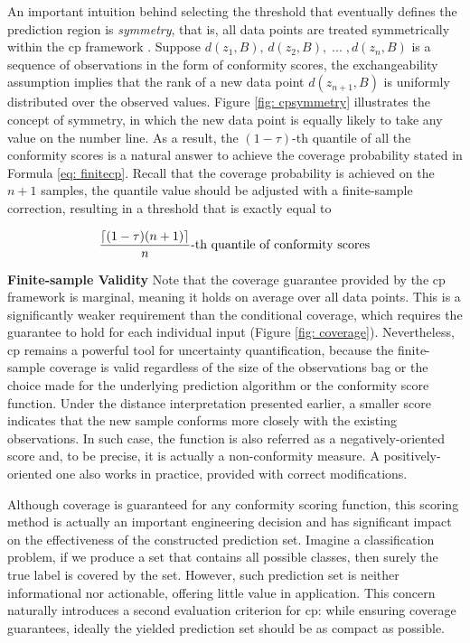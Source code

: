 \vspace{0.5em} 
An important intuition behind selecting the threshold that eventually defines the prediction region is \textit{symmetry}, that is, all data points are treated symmetrically within the \gls{cp} framework \cite{angelopoulos2021gentle}. Suppose $d(z_1, B), \, d(z_2, B), \; ... \; ,d(z_n, B)$ is a sequence of observations in the form of conformity scores, the exchangeability assumption implies that the rank of a new data point $d(z_{n+1}, B)$ is uniformly distributed over the observed values. Figure \ref{fig: cpsymmetry} illustrates the concept of symmetry, in which the new data point is equally likely to take any value on the number line. As a result, the $(1 - \tau)$-th quantile of all the conformity scores is a natural answer to achieve the coverage probability stated in Formula \ref{eq: finitecp}. Recall that the coverage probability is achieved on the $n+1$ samples, the quantile value should be adjusted with a finite-sample correction, resulting in a threshold that is exactly equal to 

\begin{equation}
\vspace{0.7em}
\frac{\lceil(1 - \tau)(n + 1)\rceil}{n}\text{-th quantile of conformity scores}
\label{eq:cpquantile}
\vspace{0.7em}
\end{equation}

\noindent
\textbf{Finite-sample Validity} Note that the coverage guarantee provided by the \gls{cp} framework is marginal, meaning it holds on average over all data points. This is a significantly weaker requirement than the conditional coverage, which requires the guarantee to hold for each individual input (Figure \ref{fig: coverage}). Nevertheless, \gls{cp} remains a powerful tool for uncertainty quantification, because the finite-sample coverage is valid regardless of the size of the observations bag or the choice made for the underlying prediction algorithm or the conformity score function. Under the distance interpretation presented earlier, a smaller score indicates that the new sample conforms more closely with the existing observations. In such case, the function is also referred as a negatively-oriented score and, to be precise, it is actually a non-conformity measure. A positively-oriented one also works in practice, provided with correct modifications. 

Although coverage is guaranteed for any conformity scoring function, this scoring method is actually an important engineering decision and has significant impact on the effectiveness of the constructed prediction set. Imagine a classification problem, if we produce a set that contains all possible classes, then surely the true label is covered by the set. However, such prediction set is neither informational nor actionable, offering little value in application. This concern naturally introduces a second evaluation criterion for \gls{cp}: while ensuring coverage guarantees, ideally the yielded prediction set should be as compact as possible.

